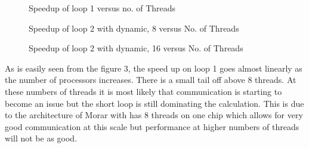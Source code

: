 \documentclass[12pt]{article}    %
\numberwithin{equation}{section}
\begin{document}
	\begin{figure}[ht]
		\centering
		
		\caption{Speedup of loop 1 versus no. of Threads}
		\label{Figure 3:}
	\end{figure}

	\begin{figure}
		\centering
		
		\caption{Speedup of loop 2 with dynamic, 8 versus No. of Threads}
		\label{Figure 4:}
	\end{figure}

	\begin{figure}
		\centering
		
		\caption{Speedup of loop 2 with dynamic, 16 versus No. of Threads}
		\label{Figure 5:}
	\end{figure}

As is easily seen from the figure 3, the speed up on loop 1 goes almost linearly as the number of processors increases.
There is a small tail off above 8 threads.
At these numbers of threads it is most likely that communication is starting to become an issue but the short loop is still dominating the calculation.
This is due to the architecture of Morar with has 8 threads on one chip which allows for very good communication at this scale but performance at higher numbers of threads will not be as good.\\
\end{document}
